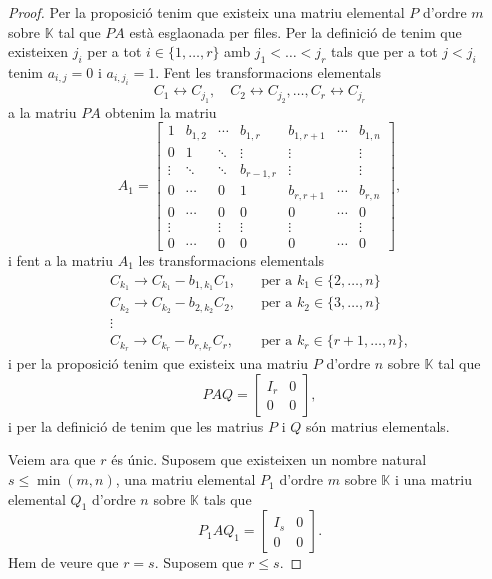 \documentclass[../Apunts.tex]{subfiles}
\begin{document}
\begin{theorem}
\begin{proof}
			Per la proposició  tenim que existeix una matriu elemental \(P\) d'ordre \(m\) sobre \(\mathbb{K}\) tal que \(PA\) està esglaonada per files. Per la definició de  tenim que existeixen \(j_{i}\) per a tot \(i\in\{1,\dots,r\}\) amb \(j_{1}<\dots<j_{r}\) tals que per a tot \(j<j_{i}\) tenim \(a_{i,j}=0\) i \(a_{i,j_{i}}=1\). Fent les transformacions elementals
			\[C_{1}\leftrightarrow C_{j_{1}},\quad C_{2}\leftrightarrow C_{j_{2}},\dots,C_{r}\leftrightarrow C_{j_{r}}\]
			a la matriu \(PA\) obtenim la matriu
			\[A_{1}=\left[\begin{array}{cccc|ccc}
			1 & b_{1,2} & \cdots & b_{1,r} & b_{1,r+1} & \cdots & b_{1,n} \\
			0 & 1 & \ddots & \vdots & \vdots & & \vdots\\
			\vdots & \ddots & \ddots & b_{r-1,r} & \vdots & & \vdots \\
			0 & \cdots & 0 & 1 & b_{r,r+1} & \cdots & b_{r,n} \\\hline
			0 & \cdots & 0 & 0 & 0 & \cdots & 0 \\
			\vdots & & \vdots & \vdots & \vdots & & \vdots \\
			0 & \cdots & 0 & 0 & 0 & \cdots & 0
			\end{array}\right],\]
			i fent a la matriu \(A_{1}\) les transformacions elementals
			\begin{align*}
			C_{k_{1}}\rightarrow C_{k_{1}}-b_{1,k_{1}}C_{1},\quad&\text{per a }k_{1}\in\{2,\dots,n\} \\
			C_{k_{2}}\rightarrow C_{k_{2}}-b_{2,k_{2}}C_{2},\quad&\text{per a }k_{2}\in\{3,\dots,n\} \\
			\vdots & \\
			C_{k_{r}}\rightarrow C_{k_{r}}-b_{r,k_{r}}C_{r},\quad&\text{per a }k_{r}\in\{r+1,\dots,n\},
			\end{align*}
			i per la proposició  tenim que existeix una matriu \(P\) d'ordre \(n\) sobre \(\mathbb{K}\) tal que
			\[PAQ=\left[\begin{array}{c|c}
			I_{r} & 0\\\hline
			0 & 0
			\end{array}\right],\]
			i per la definició de  tenim que les matrius \(P\) i \(Q\) són matrius elementals. %
			
			Veiem ara que \(r\) és únic. Suposem que existeixen un nombre natural \(s\leq\min(m,n)\), una matriu elemental \(P_{1}\) d'ordre \(m\) sobre \(\mathbb{K}\) i una matriu elemental \(Q_{1}\) d'ordre \(n\) sobre \(\mathbb{K}\) tals que
			\[P_{1}AQ_{1}=\left[\begin{array}{c|c}
			I_{s} & 0\\\hline
			0 & 0
			\end{array}\right].\]
			Hem de veure que \(r=s\). Suposem que \(r\leq s\).
			

\end{proof}
\end{theorem}
\end{document}
